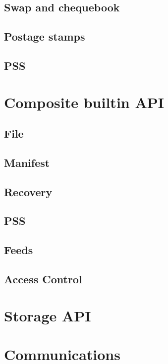 \subsection{Swap and chequebook\statusorange}\label{spec:api:swap}


\subsection{Postage stamps \statusorange}\label{spec:api:postage}


\subsection{PSS \statusorange}\label{spec:api:trojan}


\section{Composite builtin API \statusorange}\label{spec:api:builtin}

\subsection{File \statusorange}\label{spec:api:file}

\subsection{Manifest \statusorange}\label{spec:api:manifest}

\subsection{Recovery\statusorange}\label{spec:api:recovery}

\subsection{PSS \statusorange}\label{spec:api:pss}

\subsection{Feeds \statusorange}\label{spec:api:feeds}

\subsection{Access Control  \statusorange}\label{spec:api:access-control}




\section{Storage API \statusred}\label{spec:api:storage}



\section{Communications  \statusred}\label{spec:api:communications}



